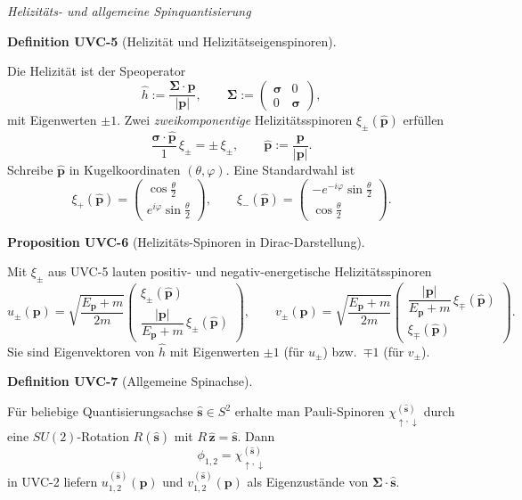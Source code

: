 \documentclass[10pt, letterpaper]{article}
\newcommand{\CustomHeading}[3]{%
  \par\medskip\noindent%
  \textbf{#1 #2} \textnormal{(#3)}.\enskip%
}
\newenvironment{DEF}[2]{\begin{unitbox}\CustomHeading{Definition}{#1}{#2}}{\end{unitbox}}
\newenvironment{PROP}[2]{\begin{unitbox}\CustomHeading{Proposition}{#1}{#2}}{\end{unitbox}}
\begin{document}
\emph{Helizitäts- und allgemeine Spinquantisierung}

\begin{DEF}{UVC-5}{Helizität und Helizitätseigenspinoren}
Die Helizität ist der Speoperator
\[
\hat h:=\frac{\mathbf\Sigma\cdot\mathbf p}{|\mathbf p|},\qquad
\mathbf\Sigma:=\begin{pmatrix}\boldsymbol\sigma&0\\[2pt]0&\boldsymbol\sigma\end{pmatrix},
\]
mit Eigenwerten $\pm1$. Zwei \emph{zweikomponentige} Helizitätsspinoren $\xi_\pm(\hat{\mathbf p})$ erfüllen
\[
\frac{\boldsymbol\sigma\cdot\hat{\mathbf p}}{1}\,\xi_\pm=\pm\,\xi_\pm,\qquad \hat{\mathbf p}:=\frac{\mathbf p}{|\mathbf p|}.
\]
Schreibe $\hat{\mathbf p}$ in Kugelkoordinaten $(\theta,\varphi)$. Eine Standardwahl ist
\[
\xi_+(\hat{\mathbf p})=
\begin{pmatrix}\cos\frac\theta2\\ e^{i\varphi}\sin\frac\theta2\end{pmatrix},\qquad
\xi_-(\hat{\mathbf p})=
\begin{pmatrix}-e^{-i\varphi}\sin\frac\theta2\\ \cos\frac\theta2\end{pmatrix}.
\]
\end{DEF}

\begin{PROP}{UVC-6}{Helizitäts-Spinoren in Dirac-Darstellung}
Mit $\xi_\pm$ aus \textsc{UVC-5} lauten positiv- und negativ-energetische Helizitätsspinoren
\[
u_\pm(\mathbf p)=\sqrt{\frac{E_{\mathbf p}+m}{2m}}
\begin{pmatrix}
\xi_\pm(\hat{\mathbf p})\\[6pt]
\dfrac{|\mathbf p|}{E_{\mathbf p}+m}\,\xi_\pm(\hat{\mathbf p})
\end{pmatrix},\qquad
v_\pm(\mathbf p)=\sqrt{\frac{E_{\mathbf p}+m}{2m}}
\begin{pmatrix}
\dfrac{|\mathbf p|}{E_{\mathbf p}+m}\,\xi_\mp(\hat{\mathbf p})\\[6pt]
\xi_\mp(\hat{\mathbf p})
\end{pmatrix}.
\]
Sie sind Eigenvektoren von $\hat h$ mit Eigenwerten $\pm1$ (für $u_\pm$) bzw.\ $\mp1$ (für $v_\pm$).
\end{PROP}

\begin{DEF}{UVC-7}{Allgemeine Spinachse}
Für beliebige Quantisierungsachse $\hat{\mathbf s}\in S^2$ erhalte man Pauli-Spinoren $\chi^{(\hat{\mathbf s})}_{\uparrow,\downarrow}$ durch eine $SU(2)$-Rotation $R(\hat{\mathbf s})$ mit $R\,\hat{\mathbf z}=\hat{\mathbf s}$. Dann
\[
\phi_{1,2}=\chi^{(\hat{\mathbf s})}_{\uparrow,\downarrow}
\]
in \textsc{UVC-2} liefern $u_{1,2}^{(\hat{\mathbf s})}(\mathbf p)$ und $v_{1,2}^{(\hat{\mathbf s})}(\mathbf p)$ als Eigenzustände von $\mathbf\Sigma\cdot\hat{\mathbf s}$.
\end{DEF}
\end{document}
